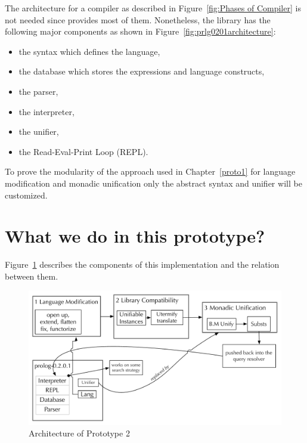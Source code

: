 \documentclass[thesis-solanki.tex]{subfiles}
\begin{document}
The architecture for a compiler as described in Figure~\ref{fig:Phases of Compiler} is not needed since
 provides most of them.
Nonetheless, the library has the following major components as shown in Figure~\ref{fig:prlg0201architecture}:

\begin{itemize}
\item the syntax which defines the language,

\item the database which stores the expressions and language constructs,

\item the parser,

\item the interpreter,

\item the unifier,

\item the Read-Eval-Print Loop (REPL).
\end{itemize}

To prove the modularity of the approach used in Chapter~\ref{proto1} for language modification and monadic unification only the abstract syntax and unifier will be customized.

\section{What we do in this prototype?}

Figure~\ref{fig:architecture-proto-2} describes the components of this implementation and the relation between them.

\begin{figure}[H]
  \includegraphics[width=1\textwidth]{Prototype-2-diagram.pdf}
\vspace*{-1cm}
  \caption{Architecture of Prototype 2}
  \label{fig:architecture-proto-2}
\end{figure}
\end{document}
